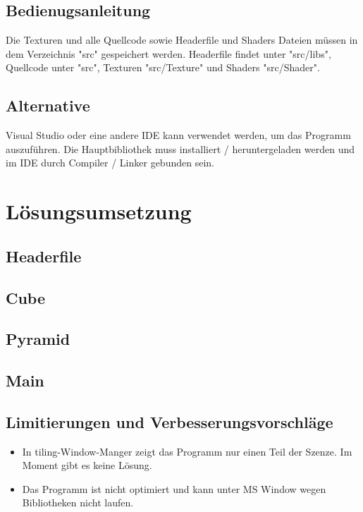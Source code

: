 \documentclass[12pt]{article}
\begin{document}
\subsection{Bedienugsanleitung}
Die Texturen und alle Quellcode sowie Headerfile und Shaders Dateien müssen in dem Verzeichnis "src" gespeichert werden. 
Headerfile findet unter "src/libs", Quellcode unter "src", Texturen "src/Texture" und Shaders "src/Shader". \\

\subsection{Alternative}
Visual Studio oder eine andere IDE kann verwendet werden, um das Programm auszuführen. Die Hauptbibliothek muss installiert / heruntergeladen werden und im IDE durch Compiler / Linker gebunden sein.

\pagebreak

\section{Lösungsumsetzung}

\subsection{Headerfile}


\subsection{Cube}


\subsection{Pyramid}


\subsection{Main}


\subsection{Limitierungen und Verbesserungsvorschläge}
\begin{itemize}
	\item In tiling-Window-Manger zeigt das Programm nur einen Teil der Szenze. Im Moment gibt es keine Lösung.
	\item Das Programm ist nicht optimiert und kann unter MS Window wegen Bibliotheken nicht laufen.
\end{itemize}
\end{document}
